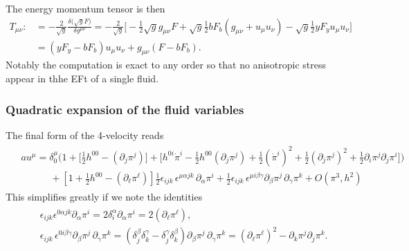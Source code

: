 The energy momentum tensor is then
{\small
\begin{align}
    T_{\mu\nu}:&=-\frac{2}{\sqrt{g}}\frac{\delta \big(\sqrt{g}F\big)}{\delta g^{\mu\nu}} = -\frac{2}{\sqrt{g}}\Big[ -\tfrac12 \sqrt{g}g_{\mu\nu} F +\sqrt{g}\tfrac12 b F_b (g_{\mu\nu}+u_\mu u_\nu) - \sqrt{g}\tfrac12 y F_y u_\mu u_\nu\Big]\\[2.5pt]
    & = (yF_y - bF_b) u_\mu u_\nu + g_{\mu\nu} (F-bF_b).
\end{align}}
Notably the computation is exact to any order so that no anisotropic stress appear in thhe EFt of a single fluid.



\subsubsection{Quadratic expansion of the fluid variables}
The final form of the 4-velocity reads
{\small\begin{align}
\begin{aligned}
    &au^\mu=\delta_0^\mu \bigg(1 \!+\! \Big[\tfrac12 h^{00} -(\partial_j \pi^j)\Big]\! +\! \Big[ h^{0 i} \dot{\pi}^i -\tfrac12 h^{00} (\partial_j \pi^j) + \tfrac12 (\dot{\pi}^i)^2 + \tfrac12 (\partial_j \pi^j)^2 +\tfrac12 \partial_i\pi^j\partial_j\pi^i\Big]\bigg)
    \\
    &\quad\qquad+\left[1 + \tfrac12 h^{00}-(\partial_\ell\pi^\ell)\right]
     \tfrac12\epsilon_{i j k}\,\epsilon^{\mu \alpha j k}\,\partial_\alpha\pi^i 
     +\tfrac{1}{2} \epsilon_{ijk}\, \epsilon^{\mu i \beta\gamma}\partial_\beta\pi^j\,\partial_\gamma\pi^k
    + O(\pi^3, h^2)
\end{aligned}\end{align}}
This simplifies greatly if we note the identities
{\small\begin{align}\begin{aligned}
    &\epsilon_{ijk}\epsilon^{0\alpha jk}\partial_\alpha\pi^i=2\delta_i^\alpha\partial_\alpha\pi^i= 2(\partial_\ell\pi^\ell),\\[2pt]
    &\epsilon_{ijk}\, \epsilon^{0 i \beta\gamma}\partial_\beta\pi^j\,\partial_\gamma\pi^k = (\delta_j^\beta\delta_k^\gamma-\delta_j^\gamma\delta_k^\beta)\partial_\beta\pi^j\,\partial_\gamma\pi^k= (\partial_\ell\pi^\ell)^2- \partial_k\pi^j\partial_j\pi^k.
\end{aligned}
\end{align}}
